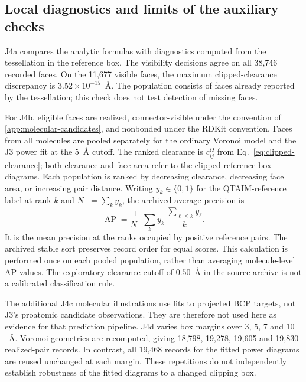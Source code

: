 \FloatBarrier
\subsection{Local diagnostics and limits of the auxiliary checks}
\label{app:molecular-diagnostics}

J4a compares the analytic formulas with diagnostics computed from the tessellation in the reference box. The visibility decisions agree on all 38,746 recorded faces. On the 11,677 visible faces, the maximum clipped-clearance discrepancy is $3.52\times10^{-15}$~\AA{}. The population consists of faces already reported by the tessellation; this check does not test detection of missing faces.

For J4b, eligible faces are realized, connector-visible under the convention of \ref{app:molecular-candidates}, and nonbonded under the RDKit convention. Faces from all molecules are pooled separately for the ordinary Voronoi model and the J3 power fit at the $5$~\AA{} cutoff. The ranked clearance is $c_{ij}^{\Omega}$ from Eq.~\eqref{eq:clipped-clearance}; both clearance and face area refer to the clipped reference-box diagrams. Each population is ranked by decreasing clearance, decreasing face area, or increasing pair distance. Writing $y_k\in\{0,1\}$ for the QTAIM-reference label at rank $k$ and $N_+=\sum_k y_k$, the archived average precision is
\[
 \operatorname{AP}
 =\frac{1}{N_+}\sum_k y_k\,
   \frac{\sum_{\ell\le k}y_\ell}{k}.
\]
It is the mean precision at the ranks occupied by positive reference pairs. The archived stable sort preserves record order for equal scores. This calculation is performed once on each pooled population, rather than averaging molecule-level AP values. The exploratory clearance cutoff of $0.50$~\AA{} in the source archive is not a calibrated classification rule.

The additional J4c molecular illustrations use fits to projected BCP targets, not J3's proatomic candidate observations. They are therefore not used here as evidence for that prediction pipeline. J4d varies box margins over $3$, $5$, $7$ and $10$~\AA{}. Voronoi geometries are recomputed, giving 18,798, 19,278, 19,605 and 19,830 realized-pair records. In contrast, all 19,468 records for the fitted power diagrams are reused unchanged at each margin. These repetitions do not independently establish robustness of the fitted diagrams to a changed clipping box.

